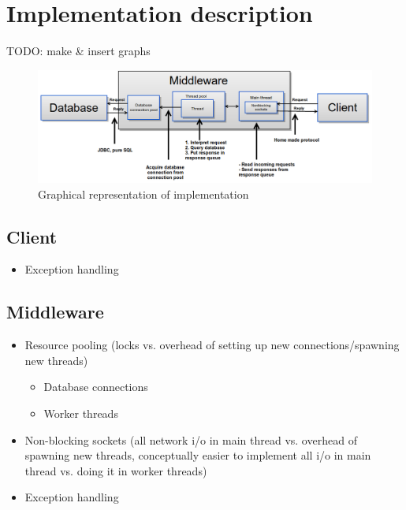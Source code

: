 \documentclass{article}
\begin{document}
    \maketitle
    \tableofcontents

    \section{Implementation description}
        TODO: make \& insert graphs
         \begin{figure}[H]
            \hspace{-2.8cm}
             \includegraphics[scale=0.50]{implementation_high_level}
             \caption{Graphical representation of implementation}
             \label{fig:implementation_high_level}
         \end{figure}

        \subsection{Client}
            \begin{itemize}
                \item Exception handling
            \end{itemize}
        \subsection{Middleware}
            \begin{itemize}
                \item Resource pooling (locks vs. overhead of setting up new connections/spawning new threads)
                \begin{itemize}
                    \item Database connections
                    \item Worker threads
                \end{itemize}
                \item Non-blocking sockets (all network i/o in main thread vs. overhead of spawning new threads, conceptually easier to implement all i/o in main thread vs. doing it in worker threads)
                \item Exception handling
            \end{itemize}
\end{document}
